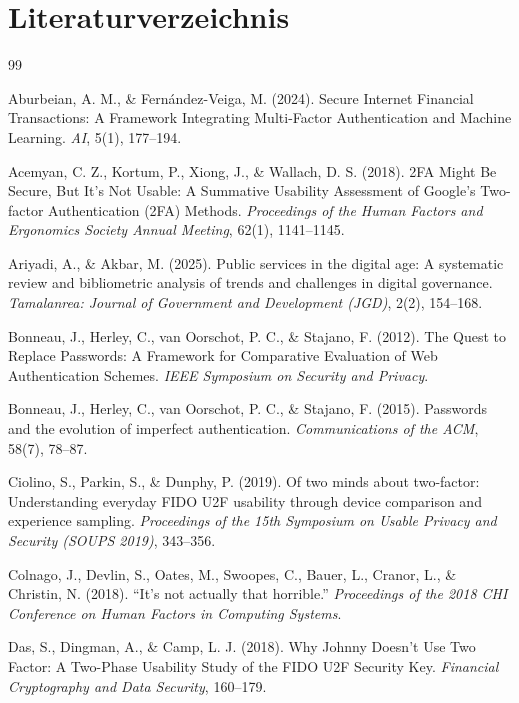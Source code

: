 \section*{Literaturverzeichnis}

\begin{thebibliography}{99}

Aburbeian, A. M., \& Fernández-Veiga, M. (2024). Secure Internet Financial Transactions: A Framework Integrating Multi-Factor Authentication and Machine Learning. \textit{AI}, 5(1), 177--194.

Acemyan, C. Z., Kortum, P., Xiong, J., \& Wallach, D. S. (2018). 2FA Might Be Secure, But It’s Not Usable: A Summative Usability Assessment of Google’s Two-factor Authentication (2FA) Methods. \textit{Proceedings of the Human Factors and Ergonomics Society Annual Meeting}, 62(1), 1141--1145.

Ariyadi, A., \& Akbar, M. (2025). Public services in the digital age: A systematic review and bibliometric analysis of trends and challenges in digital governance. \textit{Tamalanrea: Journal of Government and Development (JGD)}, 2(2), 154--168.

Bonneau, J., Herley, C., van Oorschot, P. C., \& Stajano, F. (2012). The Quest to Replace Passwords: A Framework for Comparative Evaluation of Web Authentication Schemes. \textit{IEEE Symposium on Security and Privacy}.

Bonneau, J., Herley, C., van Oorschot, P. C., \& Stajano, F. (2015). Passwords and the evolution of imperfect authentication. \textit{Communications of the ACM}, 58(7), 78--87.

Ciolino, S., Parkin, S., \& Dunphy, P. (2019). Of two minds about two-factor: Understanding everyday FIDO U2F usability through device comparison and experience sampling. \textit{Proceedings of the 15th Symposium on Usable Privacy and Security (SOUPS 2019)}, 343--356.

Colnago, J., Devlin, S., Oates, M., Swoopes, C., Bauer, L., Cranor, L., \& Christin, N. (2018). ``It’s not actually that horrible.'' \textit{Proceedings of the 2018 CHI Conference on Human Factors in Computing Systems}.

Das, S., Dingman, A., \& Camp, L. J. (2018). Why Johnny Doesn’t Use Two Factor: A Two-Phase Usability Study of the FIDO U2F Security Key. \textit{Financial Cryptography and Data Security}, 160--179.


\end{thebibliography}
